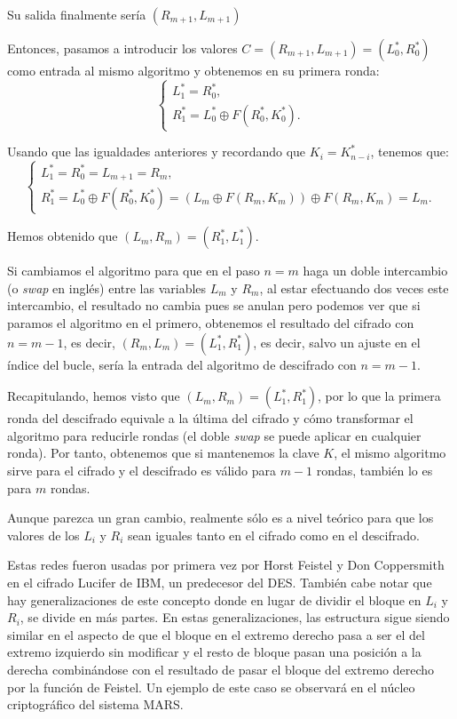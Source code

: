 \begin{itemize}
	Su salida finalmente sería $(R_{m+1}, L_{m+1})$
	
	Entonces, pasamos a introducir los valores $C = (R_{m+1}, L_{m+1}) = (L^*_0, R^*_0)$ como entrada al mismo algoritmo y obtenemos en su primera ronda:
	$$\begin{cases}
		L^*_1 = R^*_0,\\
		R^*_1 = L^*_0 \oplus F(R^*_0, K^*_0).
	\end{cases}$$
	
	Usando que las igualdades anteriores y recordando que $K_i = K^*_{n-i}$, tenemos que:
	$$\begin{cases}
		L^*_1 = R^*_0 = L_{m+1} = R_m,\\
		R^*_1 = L^*_0 \oplus F(R^*_0, K^*_0) = \left(L_m \oplus F(R_m, K_m)\right) \oplus F(R_m, K_m) = L_m.
	\end{cases}$$
	
	Hemos obtenido que $(L_m, R_m) = (R^*_1, L^*_1)$.
	
	Si cambiamos el algoritmo para que en el paso $n = m$ haga un doble intercambio (o \textit{swap} en inglés) entre las variables $L_m$ y $R_m$, al estar efectuando dos veces este intercambio, el resultado no cambia pues se anulan pero podemos ver que si paramos el algoritmo en el primero, obtenemos el resultado del cifrado con $n = m-1$, es decir, $(R_m, L_m) = (L^*_1, R^*_1)$, es decir, salvo un ajuste en el índice del bucle, sería la entrada del algoritmo de descifrado con $n = m-1$.
	
	Recapitulando, hemos visto que $(L_m, R_m) = (L^*_1, R^*_1)$, por lo que la primera ronda del descifrado equivale a la última del cifrado y cómo transformar el algoritmo para reducirle rondas (el doble \textit{swap} se puede aplicar en cualquier ronda). Por tanto, obtenemos que si mantenemos la clave $K$, el mismo algoritmo sirve para el cifrado y el descifrado es válido para $m-1$ rondas, también lo es para $m$ rondas.
	
\end{itemize}

Aunque parezca un gran cambio, realmente sólo es a nivel teórico para que los valores de los $L_i$ y $R_i$ sean iguales tanto en el cifrado como en el descifrado.

Estas redes fueron usadas por primera vez por Horst Feistel y Don Coppersmith en el cifrado Lucifer de IBM, un predecesor del DES. También cabe notar que hay generalizaciones de este concepto donde en lugar de dividir el bloque en $L_i$ y $R_i$, se divide en más partes. En estas generalizaciones, las estructura sigue siendo similar en el aspecto de que el bloque en el extremo derecho pasa a ser el del extremo izquierdo sin modificar y el resto de bloque pasan una posición a la derecha combinándose con el resultado de pasar el bloque del extremo derecho por la función de Feistel. Un ejemplo de este caso se observará en el núcleo criptográfico del sistema MARS.

